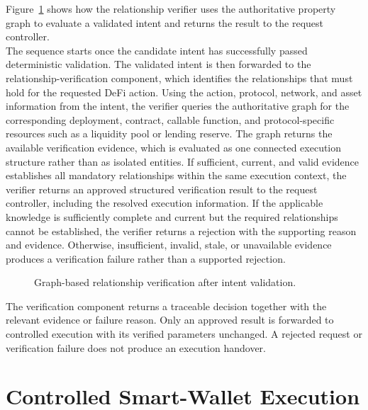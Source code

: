Figure~\ref{fig:verification_sequence} shows how the relationship verifier uses the authoritative property graph to evaluate a validated intent and returns the result to the request controller.\\
The sequence starts once the candidate intent has successfully passed
deterministic validation. The validated intent is then forwarded to the
relationship-verification component, which identifies the relationships that
must hold for the requested DeFi action. Using the action, protocol, network,
and asset information from the intent, the verifier queries the authoritative
graph for the corresponding deployment, contract, callable function, and
protocol-specific resources such as a liquidity pool or lending reserve. The
graph returns the available verification evidence, which is evaluated as one
connected execution structure rather than as isolated entities. If sufficient, current, and valid evidence establishes all mandatory
relationships within the same execution context, the verifier returns an
approved structured verification result to the request controller,
including the resolved execution information. If the applicable knowledge
is sufficiently complete and current but the required relationships cannot
be established, the verifier returns a rejection with the supporting reason
and evidence. Otherwise, insufficient, invalid, stale, or unavailable
evidence produces a verification failure rather than a supported rejection.

\begin{figure}[H]
    \centering
    \resizebox{0.95\textwidth}{!}{%
    }
   \caption{Graph-based relationship verification after intent validation.}
    \label{fig:verification_sequence}
\end{figure}

The verification component returns a traceable decision together with the
relevant evidence or failure reason. Only an approved result is forwarded
to controlled execution with its verified parameters unchanged. A rejected
request or verification failure does not produce an execution handover.



\section{Controlled Smart-Wallet Execution}
\label{sec:controlled_execution}

